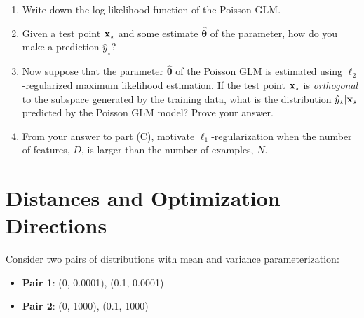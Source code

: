 \documentclass[11pt]{article}
\begin{document}
\begin{enumerate}[label=(\Alph*)]

    \item Write down the log-likelihood function of the Poisson GLM.

    \item Given a test point ${\mathbf x}_\star$ and some estimate $\hat{\bm{\theta}}$ of the parameter, how do you make a prediction $\hat{y}_\star$?

    \item Now suppose that the parameter $\hat{\bm{\theta}}$ of the Poisson GLM is estimated using $\ell_2$-regularized maximum likelihood estimation. If the test point ${\mathbf x}_\star$ is \textit{orthogonal} to the subspace generated by the training data, what is the distribution $\hat{y}_\star|{\mathbf x}_\star$ predicted by the Poisson GLM model? Prove your answer.

    \item From your answer to part (C), motivate $\ell_1$-regularization when the number of features, $D$, is larger than the number of examples, $N$.
\end{enumerate}

\newpage
\section{Distances and Optimization Directions}
Consider two pairs of distributions with mean and variance parameterization:
\begin{itemize}
\item[] \hspace{1em} \textbf{Pair 1}: (0, 0.0001), (0.1, 0.0001)
\item[] \hspace{1em} \textbf{Pair 2}: (0, 1000), (0.1, 1000)
\end{itemize}
\end{document}
